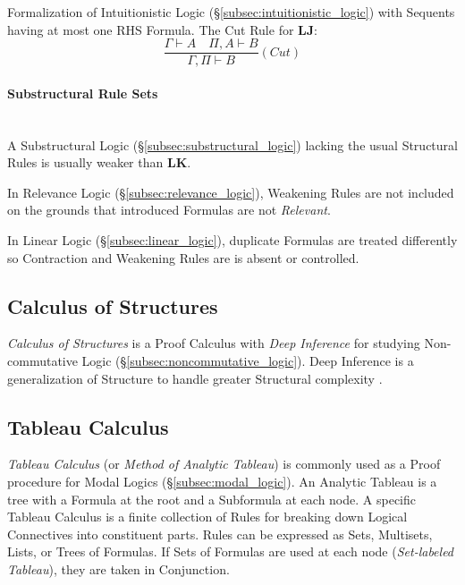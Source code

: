 \documentclass{article}
\begin{document}
Formalization of Intuitionistic Logic
(\S\ref{subsec:intuitionistic_logic}) with Sequents having at most one
RHS Formula. The Cut Rule for $\mathbf{LJ}$:
\[
    \frac{
        \Gamma \vdash A \quad \Pi, A \vdash B
    }{
        \Gamma, \Pi \vdash B
    }(Cut)
\]

\paragraph{Substructural Rule Sets} \hfill \\

A Substructural Logic (\S\ref{subsec:substructural_logic}) lacking the
usual Structural Rules is usually weaker than $\mathbf{LK}$.

In Relevance Logic (\S\ref{subsec:relevance_logic}), Weakening Rules
are not included on the grounds that introduced Formulas are not
\emph{Relevant}.

In Linear Logic (\S\ref{subsec:linear_logic}), duplicate Formulas are
treated differently so Contraction and Weakening Rules are is absent
or controlled.

\subsection{Calculus of Structures}

\emph{Calculus of Structures} is a Proof Calculus with \emph{Deep
  Inference} for studying Non-commutative Logic
(\S\ref{subsec:noncommutative_logic}). Deep Inference is a
generalization of Structure to handle greater Structural complexity
\cite{schutte77}.

\subsection{Tableau Calculus}\label{subsec:tableau_calculus}

\emph{Tableau Calculus} (or \emph{Method of Analytic Tableau}) is
commonly used as a Proof procedure for Modal Logics
(\S\ref{subsec:modal_logic}). An Analytic Tableau is a tree with a
Formula at the root and a Subformula at each node. A specific Tableau
Calculus is a finite collection of Rules for breaking down Logical
Connectives into constituent parts. Rules can be expressed as Sets,
Multisets, Lists, or Trees of Formulas. If Sets of Formulas are used
at each node (\emph{Set-labeled Tableau}), they are taken in
Conjunction.
\end{document}
